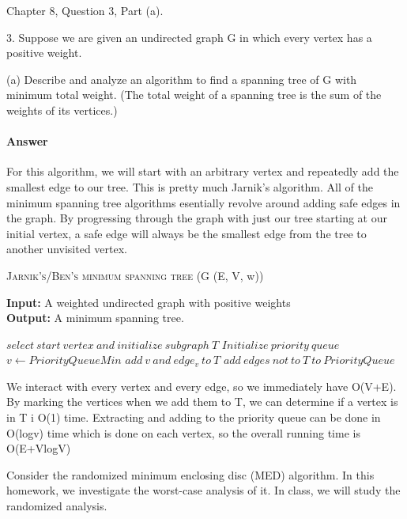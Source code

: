 \documentclass{article}
\begin{document}
\nextprob{}

Chapter 8, Question 3, Part (a).

3. Suppose we are given an undirected graph G in which every vertex has a
positive weight.

(a) Describe and analyze an algorithm to find a spanning tree of G with
minimum total weight. (The total weight of a spanning tree is the sum
of the weights of its vertices.)

\paragraph{Answer}

For this algorithm, we will start with an arbitrary vertex and repeatedly add
the smallest edge to our tree. This is pretty much Jarnik's algorithm. All
of the minimum spanning tree algorithms esentially revolve around adding safe edges
in the graph. By progressing through the graph with just our tree starting at our
initial vertex, a safe edge will always be the smallest edge from the tree to another
unvisited vertex.

\begin{algorithm} \caption{\textsc{Jarnik's/Ben's minimum spanning tree} (G (E, V, w))}\label{alg:seb}
    {\bf Input:} A weighted undirected graph with positive weights\\
    {\bf Output:} A minimum spanning tree.
    \begin{algorithmic}[1]
        \State$select\ start\ vertex\ and\ initialize\ subgraph\ T$
        \State$Initialize\ priority\ queue$
            \State$v \gets PriorityQueueMin$
                \State$add\ v\ and\ edge_v\ to\ T$
                \State$add\ edges\ not\ to\ T\ to\ PriorityQueue$
            \EndIf{}
        \EndFor{}
    \end{algorithmic}
\end{algorithm}

We interact with every vertex and every edge, so we immediately have O(V+E). By
marking the vertices when we add them to T, we can determine if a vertex is in T
i O(1) time. Extracting and adding to the priority queue can be done in O(logv) time
which is done on each vertex, so the overall running time is O(E+VlogV)

Consider the randomized minimum enclosing disc (MED) algorithm.  In this
homework, we investigate the worst-case analysis of it.  In class, we will study
the randomized analysis.
\end{document}
